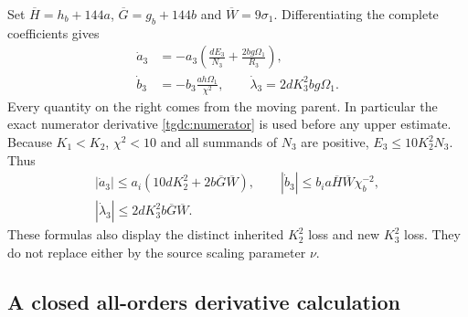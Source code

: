 Set $\overline H=h_b+144a$, $\overline G=g_b+144b$ and
$\overline W=9\sigma_1$. Differentiating the complete coefficients
gives
\begin{equation}\label{tgdc:coefficient_rates}
\begin{aligned}
 \dot a_3&=-a_3\left(\frac{dE_3}{N_3}
                            +\frac{2bg\Omega_1}{R_3}\right),\\
 \dot b_3&=-b_3\frac{ah\Omega_1}{\chi^2},\qquad
 \dot\lambda_3=2dK_3^2bg\Omega_1.
\end{aligned}
\end{equation}
Every quantity on the right comes from the moving parent. In particular
the exact numerator derivative \eqref{tgdc:numerator} is used before
any upper estimate. Because $K_1<K_2$, $\chi^2<10$ and all summands
of $N_3$ are positive, $E_3\leq10K_2^2N_3$. Thus
\begin{equation}\label{tgdc:coefficient_rate_bounds}
\begin{gathered}
 |\dot a_3|\leq
 a_i(10dK_2^2+2b\overline G\overline W),\qquad
 |\dot b_3|\leq
 b_i a\overline H\overline W\chi_b^{-2},\\
 |\dot\lambda_3|\leq
 2dK_3^2 b\overline G\overline W.
\end{gathered}
\end{equation}
These formulas also display the distinct inherited $K_2^2$ loss and
new $K_3^2$ loss. They do not replace either by the source scaling
parameter $\nu$.

\subsection{A closed all-orders derivative calculation}


